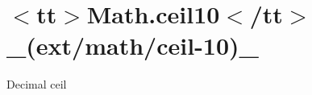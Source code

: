 \chapter{\texorpdfstring{$<$}{<}tt\texorpdfstring{$>$}{>}Math.\+ceil10\texorpdfstring{$<$}{<}/tt\texorpdfstring{$>$}{>} \+\_\+(ext/math/ceil-\/10)\+\_\+}
\hypertarget{md__2home_2solype_2delivery_2current__days_2Mannheim_2front_2node__modules_2ext_2docs_2math_2ceil-10}{}\label{md__2home_2solype_2delivery_2current__days_2Mannheim_2front_2node__modules_2ext_2docs_2math_2ceil-10}
\label{md__2home_2solype_2delivery_2current__days_2Mannheim_2front_2node__modules_2ext_2docs_2math_2ceil-10_autotoc_md2570}%
%
 Decimal ceil


\begin{DoxyCode}{0}
\DoxyCodeLine{}

\end{DoxyCode}
 
